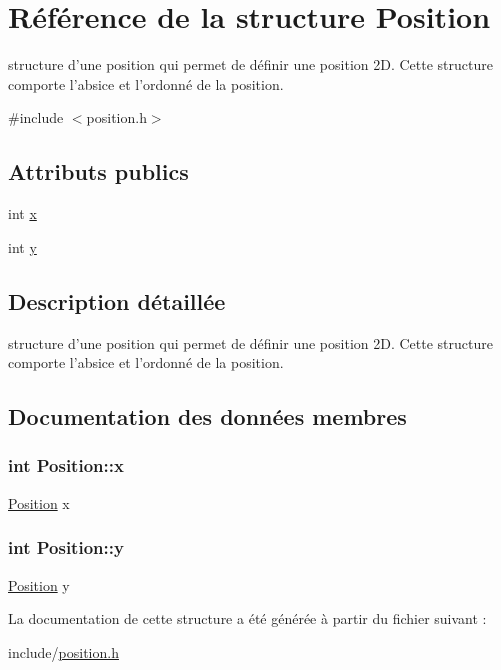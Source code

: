 \hypertarget{structPosition}{\section{\-Référence de la structure \-Position}
\label{structPosition}
}


structure d'une position qui permet de définir une position 2\-D. \-Cette structure comporte l'absice et l'ordonné de la position.  




{\ttfamily \#include $<$position.\-h$>$}

\subsection*{\-Attributs publics}
\begin{DoxyCompactItemize}
\item 
int \hyperlink{structPosition_aeda152ffeee17ae5be9c02327b2408d8}{x}
\item 
int \hyperlink{structPosition_a3c08e9213d4726b21caba3073192c4a3}{y}
\end{DoxyCompactItemize}


\subsection{\-Description détaillée}
structure d'une position qui permet de définir une position 2\-D. \-Cette structure comporte l'absice et l'ordonné de la position. 

\subsection{\-Documentation des données membres}
\hypertarget{structPosition_aeda152ffeee17ae5be9c02327b2408d8}{
\subsubsection[{x}]{\setlength{\rightskip}{0pt plus 5cm}int {\bf \-Position\-::x}}}\label{structPosition_aeda152ffeee17ae5be9c02327b2408d8}
\hyperlink{structPosition}{\-Position} x \hypertarget{structPosition_a3c08e9213d4726b21caba3073192c4a3}{
\subsubsection[{y}]{\setlength{\rightskip}{0pt plus 5cm}int {\bf \-Position\-::y}}}\label{structPosition_a3c08e9213d4726b21caba3073192c4a3}
\hyperlink{structPosition}{\-Position} y 

\-La documentation de cette structure a été générée à partir du fichier suivant \-:\begin{DoxyCompactItemize}
\item 
include/\hyperlink{position_8h}{position.\-h}\end{DoxyCompactItemize}
